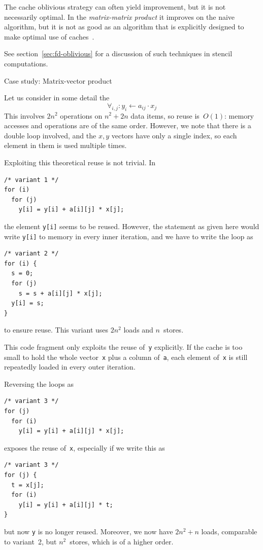 The cache oblivious strategy can often yield improvement, but it is
not necessarily optimal. In the
%
\emph{matrix-matrix product}
it improves on
the naive algorithm, but it is not as good as an algorithm that is
explicitly designed to make optimal use of
caches~\cite{GotoGeijn:2008:Anatomy}.

See section~\ref{sec:fd-oblivious} for a discussion of such techniques
in stencil computations.


 {Case study: Matrix-vector product}
\label{sec:mvp-opt}

Let us consider in some detail
the 
\[ \forall_{i,j}\colon y_i\leftarrow a_{ij}\cdot x_j \] This involves $2n^2$
operations on $n^2+2n$ data items, so reuse is~$O(1)$: memory accesses
and operations are of the same order. However, we note that there is a
double loop involved, and the $x,y$ vectors have only a single index,
so each element in them is used multiple times.

Exploiting this theoretical reuse is not trivial. In
\begin{verbatim}
/* variant 1 */
for (i)
  for (j)
    y[i] = y[i] + a[i][j] * x[j];
\end{verbatim}
the element \texttt{y[i]} seems to be reused. However, the statement
as given here would write \texttt{y[i]} to memory in every inner
iteration, and we have to write the loop as
\begin{verbatim}
/* variant 2 */
for (i) {
  s = 0;
  for (j)
    s = s + a[i][j] * x[j];
  y[i] = s;
}
\end{verbatim}
to ensure reuse. This variant uses $2n^2$ loads and $n$~stores.

This code fragment only exploits the reuse
of~\texttt{y} explicitly. If the cache is too small to hold the whole
vector~\texttt{x} plus a column of~\texttt{a}, each element
of~\texttt{x} is still repeatedly loaded in every outer iteration.

Reversing the loops as
\begin{verbatim}
/* variant 3 */
for (j)
  for (i)
    y[i] = y[i] + a[i][j] * x[j];
\end{verbatim}
exposes the reuse of~\texttt{x}, especially if we write this as
\begin{verbatim}
/* variant 3 */
for (j) {
  t = x[j];
  for (i)
    y[i] = y[i] + a[i][j] * t;
}
\end{verbatim}
but now \texttt{y} is no longer
reused. Moreover, we now have $2n^2+n$ loads, comparable to variant~2,
but $n^2$~stores, which is of a higher order.

